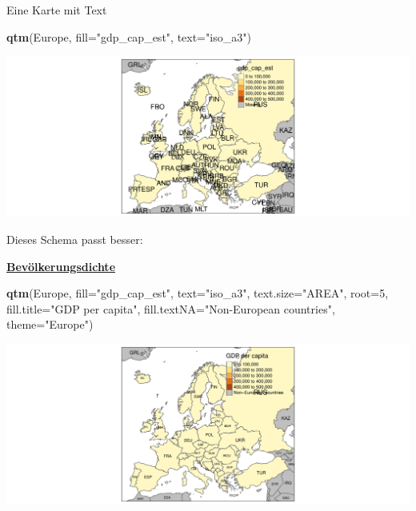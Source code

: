 \documentclass[ignorenonframetext,]{beamer}
\newenvironment{Shaded}{\begin{snugshade}}{\end{snugshade}}
\newcommand{\KeywordTok}[1]{\textcolor[rgb]{0.13,0.29,0.53}{\textbf{#1}}}
\newcommand{\DataTypeTok}[1]{\textcolor[rgb]{0.13,0.29,0.53}{#1}}
\newcommand{\DecValTok}[1]{\textcolor[rgb]{0.00,0.00,0.81}{#1}}
\newcommand{\StringTok}[1]{\textcolor[rgb]{0.31,0.60,0.02}{#1}}
\newcommand{\NormalTok}[1]{#1}
\begin{document}
\begin{frame}[fragile]{Eine Karte mit Text}

\begin{Shaded}
\begin{Highlighting}[]
\KeywordTok{qtm}\NormalTok{(Europe, }\DataTypeTok{fill=}\StringTok{"gdp_cap_est"}\NormalTok{, }\DataTypeTok{text=}\StringTok{"iso_a3"}\NormalTok{)}
\end{Highlighting}
\end{Shaded}

\includegraphics{slides_all2gether_part1_files/figure-beamer/unnamed-chunk-51-1.pdf}

\end{frame}

\begin{frame}[fragile]{Dieses Schema passt besser:}

\begin{block}{\href{https://en.wikipedia.org/wiki/Population_density}{\textbf{Bevölkerungsdichte}}}

\begin{Shaded}
\begin{Highlighting}[]
\KeywordTok{qtm}\NormalTok{(Europe, }\DataTypeTok{fill=}\StringTok{"gdp_cap_est"}\NormalTok{, }\DataTypeTok{text=}\StringTok{"iso_a3"}\NormalTok{, }
    \DataTypeTok{text.size=}\StringTok{"AREA"}\NormalTok{, }\DataTypeTok{root=}\DecValTok{5}\NormalTok{, }\DataTypeTok{fill.title=}\StringTok{"GDP per capita"}\NormalTok{, }
    \DataTypeTok{fill.textNA=}\StringTok{"Non-European countries"}\NormalTok{, }\DataTypeTok{theme=}\StringTok{"Europe"}\NormalTok{)}
\end{Highlighting}
\end{Shaded}

\includegraphics{slides_all2gether_part1_files/figure-beamer/unnamed-chunk-52-1.pdf}

\end{block}

\end{frame}
\end{document}
